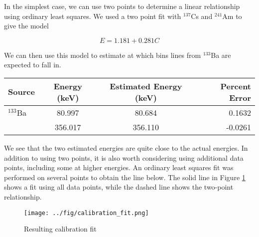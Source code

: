 In the simplest case, we can use two points to determine a linear relationship
using ordinary least squares. We used a two point fit with $^{137}$Cs and
$^{241}$Am to give the model

\begin{equation}
E = 1.181 + 0.281 C
\end{equation}

We can then use this model to estimate at which bins lines from $^{133}$Ba are
expected to fall in.

\begin{table}[H]
  \begin{center}
    \begin{tabular}{l|c|c|r}
      \textbf{Source} & \textbf{Energy (keV)} & \textbf{Estimated Energy (keV)} & \textbf{Percent Error}\\
      \hline
      $^{133}$Ba    &  80.997    & 80.684   &  0.1632 \\
                    &  356.017   & 356.110  &  -0.0261 \\
    \end{tabular}
  \end{center}
\end{table}

We see that the two estimated energies are quite close to the actual energies. In addition to using two points,
it is also worth considering using additional data points, including some at higher energies. An ordinary least
squares fit was performed on several points to obtain the line below. The solid line in Figure \ref{fig:fit} shows a fit using all data points,
while the dashed line shows the two-point relationship.

\begin{figure}[H]
\label{fig:fit}
\begin{center}
\texttt{[image: ../fig/calibration\_fit.png]}
\caption{Resulting calibration fit}
\end{center}
\end{figure}
